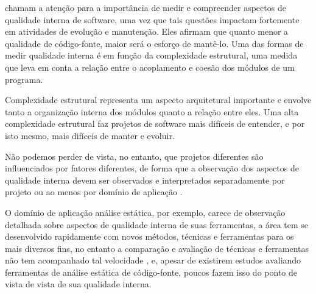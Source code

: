  chamam a atenção para a importância de medir e
compreender aspectos de qualidade interna de software, uma vez que tais
questões impactam fortemente em atividades de evolução e manutenção. Eles
afirmam que quanto menor a qualidade de código-fonte, maior será o esforço de
mantê-lo. Uma das formas de medir qualidade interna é em função da
complexidade estrutural, uma medida que leva em conta a relação entre o
acoplamento e coesão dos módulos de um programa.

Complexidade estrutural representa um aspecto arquitetural importante e envolve
tanto a organização interna dos módulos quanto a relação entre eles. Uma alta
complexidade estrutural faz projetos de software mais difíceis de entender, e
por isto mesmo, mais difíceis de manter e evoluir.

Não podemos perder de vista, no entanto, que projetos diferentes são
influenciados por fatores diferentes, de forma que a observação dos aspectos
de qualidade interna devem ser observados e interpretados separadamente por
projeto \cite{Terceiro2012Understanding} ou ao menos por domínio de
aplicação \cite{Meirelles2013}.

O domínio de aplicação análise estática, por exemplo, carece de observação
detalhada sobre aspectos de qualidade interna de suas ferramentas, a
área tem se desenvolvido rapidamente com novos métodos, técnicas e ferramentas
para os mais diversos fins, no entanto a comparação e avaliação de técnicas e ferramentas
não tem acompanhado tal velocidade \cite{Li2010}, e, apesar de existirem
estudos avaliando ferramentas de análise estática de código-fonte, poucos
fazem isso do ponto de vista de vista de sua qualidade interna.

